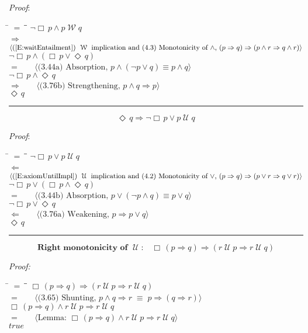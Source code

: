 \documentclass[12pt, fleqn, leqno]{article}
\newcommand{\lgap}{2pt}                             %
\newcommand{\mymathindent}{24pt}                    %
\newcommand{\equivs}{\ensuremath{\;\equiv\;}}       %
\newcommand{\impl}{\ensuremath{\Rightarrow}}        %
\newcommand{\foll}{\ensuremath{\Leftarrow}}         %
\newcommand{\Until}{\;\mathcal{U}\;}
\newcommand{\Wait}{\;\mathcal{W}\;}
\newcommand{\Event}{\Diamond\,}
\newcommand{\Always}{\Box\,}
\newcommand{\myqed}{\rule[-.23ex]{1.2ex}{2.0ex}}
\newcommand{\myqedtab}{\hspace{384pt}}              %
\newcommand{\Gll} {\langle}                         %
\newcommand{\Ggg} {\rangle}                         %
\newcommand{\Hint}[1]     {\ \ \ $\Gll              \mbox{#1} \Ggg$ }   %
\begin{document}
\emph{Proof}:
\begin{tabbing}
\hspace{\mymathindent} \= $= \;$ \= \myqedtab \= \kill
\> \> $\neg\Always p\land p \Wait q$\\[\lgap]
\> $\impl$ \> \Hint{(\ref{E:waitEntailment}) $\Wait$ implication and (4.3) Monotonicity of $\land$, $(p\impl q)\impl (p\land r \impl q\land r)$} \\[\lgap]
\> \> $\neg\Always p\land (\Always p \lor \Event q)$\\[\lgap]
\> $=$ \> \Hint{(3.44a) Absorption, $p\land (\neg p\lor q)\equiv p\land q$} \\[\lgap]
\> \> $\neg\Always p\land \Event q$\\[\lgap]
\> $\impl$ \> \Hint{(3.76b) Strengthening, $p\land q \impl p$} \\[\lgap]
\> \> $\Event q$ \quad \myqed
\end{tabbing}
\begin{equation}\label{E:untilEntailEvent}
\Event q\impl \neg\Always p\lor p \Until q
\end{equation}

\emph{Proof}:
\begin{tabbing}
\hspace{\mymathindent} \= $= \;$ \= \myqedtab \= \kill
\> \> $\neg\Always p\lor p \Until q$\\[\lgap]
\> $\foll$ \> \Hint{(\ref{E:axiomUntilImpl}) $\Until$ implication and (4.2) Monotonicity of $\lor$, $(p\impl q)\impl (p\lor r \impl q\lor r)$} \\[\lgap]
\> \> $\neg\Always p\lor (\Always p\land \Event q)$\\[\lgap]
  \> $=$  \>  \Hint{(3.44b) Absorption, $p \lor (\neg p \land q) \equiv p \lor q$}\\[\lgap]
\> \> $\neg\Always p\lor \Event q$\\[\lgap]
\> $\foll$ \> \Hint{(3.76a) Weakening, $p\impl p\lor q$} \\[\lgap]
\> \> $\Event q$ \quad \myqed
\end{tabbing}
\begin{equation}\label{E:rightMonoUntil}
\textbf{Right monotonicity of $\Until$:}\quad \Always (p \impl q) \impl (r \Until p \impl r \Until q)
\end{equation}

\emph{Proof:}
\begin{tabbing}
\hspace{\mymathindent} \= $= \;$ \= \myqedtab \= \kill
  \> \>   $\Always (p \impl q) \impl (r \Until p \impl r \Until q)$\\[\lgap]
  \> $=$  \>  \Hint{(3.65) Shunting, $p\land q \impl r \equivs p \impl (q \impl r)$}\\[\lgap]
  \> \>   $\Always (p \impl q) \land r \Until p \impl r \Until q$\\[\lgap]
  \> $=$  \>  \Hint{Lemma: $\Always (p \impl q) \land r \Until p \impl r \Until q$}\\[\lgap]
  \> \>   $true$
\end{tabbing}
\end{document}
